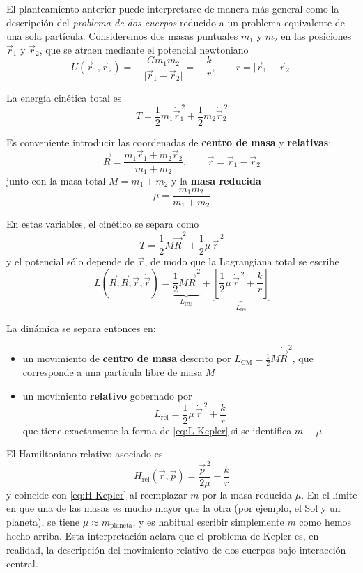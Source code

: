 \documentclass{article}
\begin{document}
El planteamiento anterior puede interpretarse de manera más general como la
descripción del \emph{problema de dos cuerpos} reducido a un problema
equivalente de una sola partícula. Consideremos dos masas puntuales
$m_{1}$ y $m_{2}$ en las posiciones $\vec r_{1}$ y $\vec r_{2}$, que se
atraen mediante el potencial newtoniano
\[
U(\vec r_{1},\vec r_{2})
= -\,\frac{G m_{1} m_{2}}{\lvert \vec r_{1} - \vec r_{2}\rvert}
= -\,\frac{k}{r},
\qquad
r = \lvert\vec r_{1}-\vec r_{2}\rvert
\]

La energía cinética total es
\[
T = \frac{1}{2}m_{1}\dot{\vec r}_{1}^{\,2}
  + \frac{1}{2}m_{2}\dot{\vec r}_{2}^{\,2}
\]

Es conveniente introducir las coordenadas de \textbf{centro de masa} y
\textbf{relativas}:
\begin{equation}
\vec R = \frac{m_{1}\vec r_{1} + m_{2}\vec r_{2}}{m_{1}+m_{2}},
\qquad
\vec r = \vec r_{1} - \vec r_{2}
\label{eq:CM-rel}
\end{equation}
junto con la masa total $M = m_{1}+m_{2}$ y la \textbf{masa reducida}
\begin{equation}
\mu = \frac{m_{1}m_{2}}{m_{1}+m_{2}}
\label{eq:masa-reducida}
\end{equation}

En estas variables, el cinético se separa como
\[
T = \frac{1}{2}M\dot{\vec R}^{\,2}
  + \frac{1}{2}\mu\,\dot{\vec r}^{\,2}
\]
y el potencial sólo depende de $\vec r$, de modo que la Lagrangiana total
se escribe
\[
L(\vec R,\dot{\vec R},\vec r,\dot{\vec r})
= \underbrace{\frac{1}{2}M\dot{\vec R}^{\,2}}_{L_{\text{CM}}}
+ \underbrace{\left[
    \frac{1}{2}\mu\,\dot{\vec r}^{\,2}
    + \frac{k}{r}
  \right]}_{L_{\text{rel}}}
\]

La dinámica se separa entonces en:

\begin{itemize}
  \item[$\bullet$] un movimiento de \textbf{centro de masa} descrito por
        $L_{\text{CM}} = \tfrac{1}{2}M\dot{\vec R}^{\,2}$, que corresponde a
        una partícula libre de masa $M$

   \item[$\bullet$] un movimiento \textbf{relativo} gobernado por
        \[
        L_{\text{rel}} = \frac{1}{2}\mu\,\dot{\vec r}^{\,2} + \frac{k}{r}
        \]
        que tiene exactamente la forma de \eqref{eq:L-Kepler} si se identifica
        $m \equiv \mu$
\end{itemize}

El Hamiltoniano relativo asociado es
\[
H_{\text{rel}}(\vec r,\vec p)
= \frac{\vec p^{\,2}}{2\mu} - \frac{k}{r}
\]
y coincide con \eqref{eq:H-Kepler} al reemplazar $m$ por la masa reducida
$\mu$. En el límite en que una de las masas es mucho mayor que la otra
(por ejemplo, el Sol y un planeta), se tiene $\mu \approx m_{\text{planeta}}$,
y es habitual escribir simplemente $m$ como hemos hecho arriba. Esta
interpretación aclara que el problema de Kepler es, en realidad, la
descripción del movimiento relativo de dos cuerpos bajo interacción central.
\end{document}
